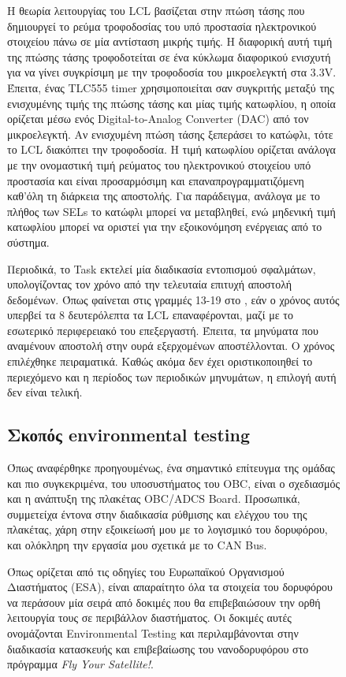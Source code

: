 \documentclass[a4paper,nobib,justified]{tufte-book}
\begin{document}
\begin{figure}
Η θεωρία λειτουργίας του LCL βασίζεται στην πτώση τάσης που δημιουργεί το ρεύμα τροφοδοσίας του υπό προστασία ηλεκτρονικού στοιχείου πάνω σε μία αντίσταση μικρής τιμής. Η διαφορική αυτή τιμή της πτώσης τάσης τροφοδοτείται σε ένα κύκλωμα διαφορικού ενισχυτή για να γίνει συγκρίσιμη με την τροφοδοσία του μικροελεγκτή στα 3.3V. Έπειτα, ένας TLC555 timer χρησιμοποιείται σαν συγκριτής μεταξύ της ενισχυμένης τιμής της πτώσης τάσης και μίας τιμής κατωφλίου, η οποία ορίζεται μέσω ενός Digital-to-Analog Converter (DAC) από τον μικροελεγκτή. Αν ενισχυμένη πτώση τάσης ξεπεράσει το κατώφλι, τότε το LCL διακόπτει την τροφοδοσία. Η τιμή κατωφλίου ορίζεται ανάλογα με την ονομαστική τιμή ρεύματος του ηλεκτρονικού στοιχείου υπό προστασία και είναι προσαρμόσιμη και επαναπρογραμματιζόμενη καθ'όλη τη διάρκεια της αποστολής. Για παράδειγμα, ανάλογα με το πλήθος των SELs το κατώφλι μπορεί να μεταβληθεί, ενώ μηδενική τιμή κατωφλίου μπορεί να οριστεί για την εξοικονόμηση ενέργειας από το σύστημα.

Περιοδικά, το Task εκτελεί μία διαδικασία εντοπισμού σφαλμάτων, υπολογίζοντας τον χρόνο από την τελευταία επιτυχή αποστολή δεδομένων.  Όπως φαίνεται στις γραμμές 13-19 στο , εάν ο χρόνος αυτός υπερβεί τα 8 δευτερόλεπτα τα LCL επαναφέρονται, μαζί με το εσωτερικό περιφερειακό του επεξεργαστή. Έπειτα, τα μηνύματα που αναμένουν αποστολή στην ουρά εξερχομένων αποστέλλονται. Ο χρόνος επιλέχθηκε πειραματικά. Καθώς ακόμα δεν έχει οριστικοποιηθεί το περιεχόμενο και η περίοδος των περιοδικών μηνυμάτων, η επιλογή αυτή δεν είναι τελική.

\subsection{Σκοπός environmental testing}
Όπως αναφέρθηκε προηγουμένως, ένα σημαντικό επίτευγμα της ομάδας και πιο συγκεκριμένα, του υποσυστήματος του OBC, είναι ο σχεδιασμός και η ανάπτυξη της πλακέτας OBC/ADCS Board. Προσωπικά, συμμετείχα έντονα στην διαδικασία ρύθμισης και ελέγχου του της πλακέτας, χάρη στην εξοικείωσή μου με το λογισμικό του δορυφόρου, και ολόκληρη την εργασία μου σχετικά με το CAN Bus.

Όπως ορίζεται από τις οδηγίες του Ευρωπαϊκού Οργανισμού Διαστήματος (ESA), είναι απαραίτητο όλα τα στοιχεία του δορυφόρου να περάσουν μία σειρά από δοκιμές που θα επιβεβαιώσουν την ορθή λειτουργία τους σε περιβάλλον διαστήματος. Οι δοκιμές αυτές ονομάζονται Environmental Testing και περιλαμβάνονται στην διαδικασία κατασκευής και επιβεβαίωσης του νανοδορυφόρου στο πρόγραμμα \textit{Fly Your Satellite!}.


\end{figure}
\end{document}
